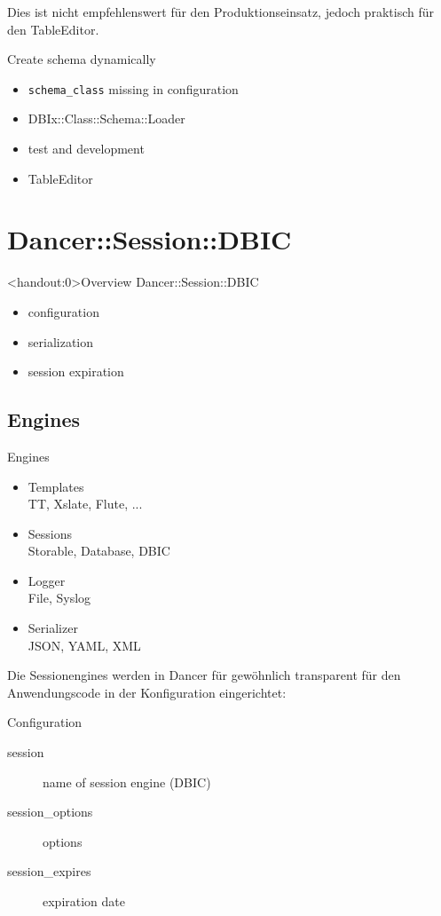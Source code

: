 Dies ist nicht empfehlenswert für den Produktionseinsatz, jedoch
praktisch für den TableEditor.

\begin{frame}[fragile]{Create schema dynamically}
\begin{itemize}
\item \verb|schema_class| missing in configuration
\item DBIx::Class::Schema::Loader
\item test and development
\item TableEditor
\end{itemize}
\end{frame}

\section{Dancer::Session::DBIC}

\begin{frame}<handout:0>{Overview Dancer::Session::DBIC}
\begin{itemize}
\item configuration
\item serialization
\item session expiration
\end{itemize}
\end{frame}

\subsection{Engines}
\begin{frame}{Engines}
\begin{itemize}
\item Templates \\
TT, Xslate, Flute, ...
\item Sessions \\ 
Storable, Database, DBIC
\item Logger \\
File, Syslog
\item Serializer  \\
JSON, YAML, XML
\end{itemize}
\end{frame}

Die Sessionengines werden in Dancer für gewöhnlich transparent
für den Anwendungscode in der Konfiguration eingerichtet:

\begin{frame}{Configuration}
\begin{description}
\item[session] name of session engine (DBIC)
\item[session\_options] options
\item[session\_expires] expiration date
\end{description}
\end{frame}


